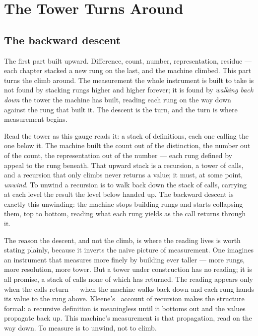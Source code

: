 \chapter{The Tower Turns Around}

\section{The backward descent}

The first part built upward. Difference, count, number, representation, residue --- each chapter stacked a new rung on
the last, and the machine climbed. This part turns the climb around. The measurement the whole instrument is built to
take is not found by stacking rungs higher and higher forever; it is found by \emph{walking back down} the tower the
machine has built, reading each rung on the way down against the rung that built it. The descent is the turn, and the
turn is where measurement begins.

Read the tower as this gauge reads it: a stack of definitions, each one calling the one below it. The machine built the
count out of the distinction, the number out of the count, the representation out of the number --- each rung defined by
appeal to the rung beneath. That upward stack is a recursion, a tower of calls, and a recursion that only climbs never
returns a value; it must, at some point, \emph{unwind}. To unwind a recursion is to walk back down the stack of calls,
carrying at each level the result the level below handed up. The backward descent is exactly this unwinding: the machine
stops building rungs and starts collapsing them, top to bottom, reading what each rung yields as the call returns
through it.

The reason the descent, and not the climb, is where the reading lives is worth stating plainly, because it inverts the
naive picture of measurement. One imagines an instrument that measures more finely by building ever taller --- more
rungs, more resolution, more tower. But a tower under construction has no reading; it is all promise, a stack of calls
none of which has returned. The reading appears only when the calls return --- when the machine walks back down and each
rung hands its value to the rung above. Kleene's~\cite{kleene1952} account of recursion makes the structure formal: a
recursive definition is meaningless until it bottoms out and the values propagate back up. This machine's measurement is
that propagation, read on the way down. To measure is to unwind, not to climb.

